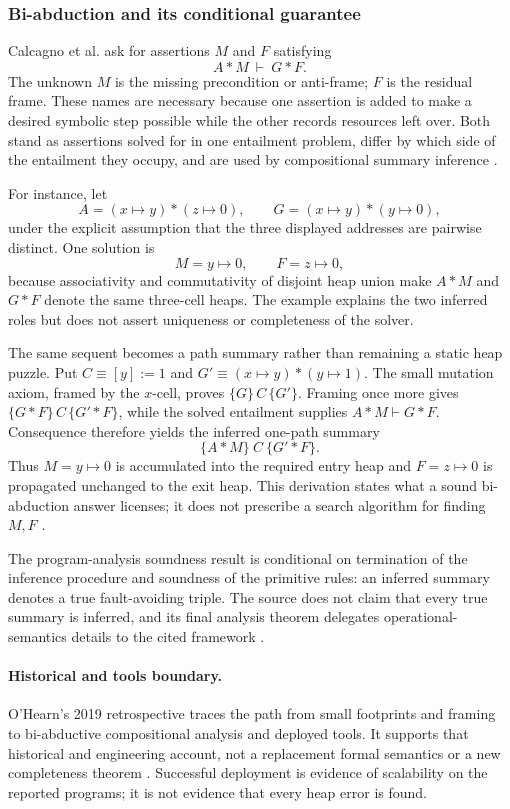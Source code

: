 \subsubsection{Bi-abduction and its conditional guarantee}

Calcagno et al. ask for assertions \(M\) and \(F\) satisfying
\[
 A*M\ \vdash\ G*F.
\]
The unknown \(M\) is the missing precondition or anti-frame; \(F\) is the
residual frame.  These names are necessary because one assertion is added to
make a desired symbolic step possible while the other records resources left
over.  Both stand as assertions solved for in one entailment problem, differ by
which side of the entailment they occupy, and are used by compositional summary
inference \cite[\S\S2--3]{CalcagnoDistefanoOHearnYang2011}.

For instance, let
\[
 A=(x\mapsto y)*(z\mapsto0),
 \qquad
 G=(x\mapsto y)*(y\mapsto0),
\]
under the explicit assumption that the three displayed addresses are pairwise
distinct.  One solution is
\[
 M=y\mapsto0,
 \qquad
 F=z\mapsto0,
\]
because associativity and commutativity of disjoint heap union make
\(A*M\) and \(G*F\) denote the same three-cell heaps.  The example explains the
two inferred roles but does not assert uniqueness or completeness of the
solver.

The same sequent becomes a path summary rather than remaining a static heap
puzzle.  Put \(C\equiv[y]:=1\) and
\(G'\equiv(x\mapsto y)*(y\mapsto1)\).  The small mutation axiom, framed by the
\(x\)-cell, proves \(\{G\}\,C\,\{G'\}\).  Framing once more gives
\(\{G*F\}\,C\,\{G'*F\}\), while the solved entailment supplies
\(A*M\vdash G*F\).  Consequence therefore yields the inferred one-path
summary
\[
 \{A*M\}\ C\ \{G'*F\}.
\]
Thus \(M=y\mapsto0\) is accumulated into the required entry heap and
\(F=z\mapsto0\) is propagated unchanged to the exit heap.  This derivation
states what a sound bi-abduction answer licenses; it does not prescribe a
search algorithm for finding \(M,F\)
\cite[\S\S3--4]{CalcagnoDistefanoOHearnYang2011}.

The program-analysis soundness result is conditional on termination of the
inference procedure and soundness of the primitive rules: an inferred summary
denotes a true fault-avoiding triple.  The source does not claim that every true
summary is inferred, and its final analysis theorem delegates operational-
semantics details to the cited framework
\cite[thm.~4.14]{CalcagnoDistefanoOHearnYang2011}.

\paragraph{Historical and tools boundary.}
O'Hearn's 2019 retrospective traces the path from small footprints and framing
to bi-abductive compositional analysis and deployed tools.  It supports that
historical and engineering account, not a replacement formal semantics or a
new completeness theorem \cite{OHearn2019}.  Successful deployment is evidence
of scalability on the reported programs; it is not evidence that every heap
error is found.
